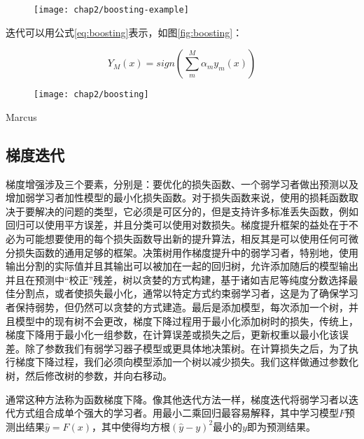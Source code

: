 \begin{figure}[!htp]
    \centering
    \texttt{[image: chap2/boosting-example]}
\end{figure}

迭代可以用公式\ref{eq:boosting}表示，如图\ref{fig:boosting}：

{\setlength\abovedisplayskip{15pt}
\setlength\belowdisplayskip{15pt}
\begin{equation}
    \label{eq:boosting}
    Y_{M}(x)=sign(\sum_{m}^M\alpha_{m}y_{m}(x))
\end{equation}}

\begin{figure}[!htp]
    \centering
    \texttt{[image: chap2/boosting]}
\end{figure}Marcus

\subsection{梯度迭代}

梯度增强涉及三个要素，分别是：要优化的损失函数、一个弱学习者做出预测以及增加弱学习者加性模型的最小化损失函数。对于损失函数来说，使用的损耗函数取决于要解决的问题的类型，它必须是可区分的，但是支持许多标准丢失函数，例如回归可以使用平方误差，并且分类可以使用对数损失。梯度提升框架的益处在于不必为可能想要使用的每个损失函数导出新的提升算法，相反其是可以使用任何可微分损失函数的通用足够的框架。决策树用作梯度提升中的弱学习者，特别地，使用输出分割的实际值并且其输出可以被加在一起的回归树，允许添加随后的模型输出并且在预测中“校正”残差，树以贪婪的方式构建，基于诸如吉尼等纯度分数选择最佳分割点，或者使损失最小化，通常以特定方式约束弱学习者，这是为了确保学习者保持弱势，但仍然可以贪婪的方式建造。最后是添加模型，每次添加一个树，并且模型中的现有树不会更改，梯度下降过程用于最小化添加树时的损失，传统上，梯度下降用于最小化一组参数，在计算误差或损失之后，更新权重以最小化该误差。除了参数我们有弱学习器子模型或更具体地决策树。在计算损失之后，为了执行梯度下降过程，我们必须向模型添加一个树以减少损失。我们这样做通过参数化树，然后修改树的参数，并向右移动。

通常这种方法称为函数梯度下降。像其他迭代方法一样，梯度迭代将弱学习者以迭代方式组合成单个强大的学习者。用最小二乘回归最容易解释，其中学习模型$F$预测出结果$\hat{y} = F(x)$，其中使得均方根$(\hat{y} - y)^2$最小的$y$即为预测结果。

